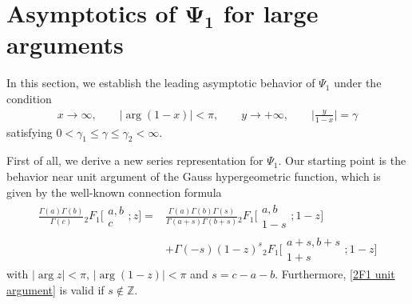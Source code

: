 \documentclass[10pt,a4paper]{amsart}
\numberwithin{equation}{section}
\newcommand{\ZZ}{\ensuremath{\mathbb{Z}}}
\begin{document}
\section[Asymptotics of Psi\_1 for large arguments]{Asymptotics of $\boldsymbol{\Psi_1}$ for large arguments}\label{Sect. 3}
In this section, we establish the leading asymptotic behavior of $\Psi_1$ under the condition
\begin{gather}\label{Psi_1 asymptotic condition}
	x\to \infty,\qquad |{\arg}(1-x)|<\pi,\qquad y\to +\infty,\qquad \biggl|\frac{y}{1-x}\biggr|=\gamma
\end{gather}
satisfying $0<\gamma_1\leqslant \gamma\leqslant \gamma_2<\infty$.

First of all, we derive a new series representation for $\Psi_1$. Our starting point is the behavior near unit argument of the Gauss hypergeometric function, which is given by the well-known connection formula \cite[equation~(1.2)]{Buhring-1987}
\begin{align}
		\frac{\Gamma(a)\Gamma(b)}{\Gamma(c)}{}_2F_1\biggl[\begin{matrix}
			a,b \\
			c
		\end{matrix};z\biggr]= {}& \frac{\Gamma(a)\Gamma(b)\Gamma(s)}{\Gamma(a+s)\Gamma(b+s)}
		{}_2F_1\biggl[\begin{matrix}
			a,b \\
			1-s
		\end{matrix};1-z\biggr]\nonumber\\
		 & +\Gamma(-s)(1-z)^s
		{}_2F_1\biggl[\begin{matrix}
			a+s,b+s \\
			1+s
		\end{matrix};1-z\biggr]\label{2F1 unit argument}
\end{align}
with $|\arg z|<\pi$, $|{\arg}(1-z)|<\pi$ and $s=c-a-b$. Furthermore, \eqref{2F1 unit argument} is valid if $s\notin\ZZ$.
\end{document}

